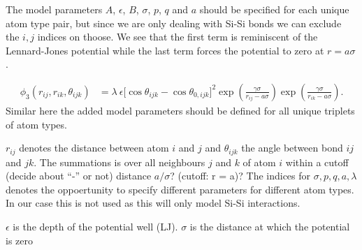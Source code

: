 The model parameters $A$, $\epsilon$, $B$, $\sigma$, $p$, $q$ and $a$ should be specified for each unique atom type pair, but since we are only dealing with Si-Si bonds we can exclude the $i,j$ indices on thoose. We see that the first term is reminiscent of the Lennard-Jones potential while the last term forces the potential to zero at $r=a\sigma$.

\begin{align*}
  \phi_3(r_{ij}, r_{ik}, \theta_{ijk}) &= \lambda \ \epsilon \Big[\cos \theta_{ijk}-\cos \theta_{0,ijk}\Big]^2 \exp (\frac{\gamma \sigma}{r_{ij} - a \sigma}) \exp (\frac{\gamma \sigma}{r_{ik} - a \sigma}).
\end{align*}
Similar here the added model parameters should be defined for all unique triplets of atom types. 


$r_{ij}$ denotes the distance between atom $i$ and $j$ and $\theta_{ijk}$ the angle between bond $ij$ and $jk$. The summations is over all neighbours $j$ and $k$ of atom $i$ within a cutoff (decide about ``-'' or not) distance  $a/\sigma$? (cutoff: r = a)? The indices for $\sigma, p, q, a, \lambda$ denotes the oppoertunity to specify different parameters for different atom types. In our case this is not used as this will only model Si-Si interactions. 




$\epsilon$ is the depth of the potential well (LJ). $\sigma$ is the distance at which the potential is zero


